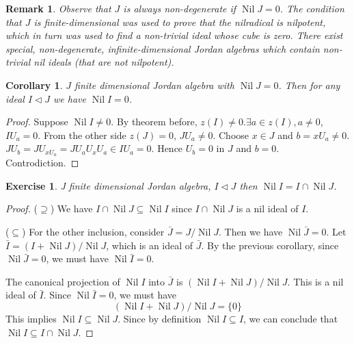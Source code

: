 \documentclass{article}
\newtheorem{corollary}[theorem]{Corollary}
\newtheorem{remark}[theorem]{Remark}
\newtheorem{exercise}[theorem]{Exercise}
\begin{document}
\begin{remark}  
Observe that $J$ is always non-degenerate if $\operatorname{Nil} J = 0$. The condition that $J$ is finite-dimensional was used to prove that the nilradical is nilpotent, which in turn was used to find a non-trivial ideal whose cube is zero. There exist special, non-degenerate, infinite-dimensional Jordan algebras which contain non-trivial nil ideals (that are not nilpotent).  
\end{remark} 

\begin{corollary}
$ J $ finite dimensional Jordan algebra with $ \operatorname{Nil}J=0 $. Then for any ideal $ I \triangleleft J $ we have $ \operatorname{Nil}I=0 $.    
\end{corollary}

\begin{proof} 
Suppose $ \operatorname{Nil}I\neq 0 $. By theorem before, $ z(I)\neq 0 $.$\exists a \in z(I), a \neq 0 $, $ IU_a=0 $. From the other side $ z(J)=0 $, $ JU_a \neq 0 $. Choose $ x \in J $ and $ b = xU_a \neq 0 $. $ JU_b = JU_{xU_a}=JU_aU_xU_a \in IU_a =0$. Hence $ U_b =0  $ in $ J $ and $ b=0 $. Controdiction.           
\end{proof}

\begin{exercise}
J finite dimensional Jordan algebra, $ I \triangleleft J $ then $ \operatorname{Nil}I =I \cap \operatorname{Nil}J $.  
\end{exercise}

\begin{proof} 
($\supseteq$) We have $I \cap \operatorname{Nil} J \subseteq \operatorname{Nil} I$ since $I \cap \operatorname{Nil} J$ is a nil ideal of $I$.  

($\subseteq$) For the other inclusion, consider $\bar{J} = J/\operatorname{Nil} J$. Then we have $\operatorname{Nil} \bar{J} = 0$.  
Let $\bar{I} = (I + \operatorname{Nil} J) / \operatorname{Nil} J$, which is an ideal of $\bar{J}$.  
By the previous corollary, since $\operatorname{Nil} \bar{J} = 0$, we must have $\operatorname{Nil} \bar{I} = 0$.  

The canonical projection of $\operatorname{Nil} I$ into $\bar{J}$ is $(\operatorname{Nil} I + \operatorname{Nil} J) / \operatorname{Nil} J$. This is a nil ideal of $\bar{I}$. Since $\operatorname{Nil} \bar{I} = 0$, we must have  
\[ (\operatorname{Nil} I + \operatorname{Nil} J) / \operatorname{Nil} J = \{0\} \]  
This implies $\operatorname{Nil} I \subseteq \operatorname{Nil} J$.  
Since by definition $\operatorname{Nil} I \subseteq I$, we can conclude that $\operatorname{Nil} I \subseteq I \cap \operatorname{Nil} J$.  
\end{proof}
\end{document}
